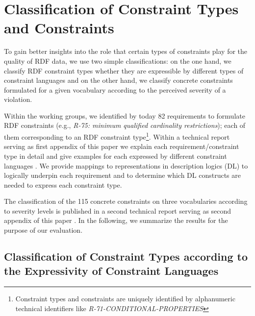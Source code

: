 \documentclass[conference]{IEEEtran}
\begin{document}
\section{Classification of Constraint Types and Constraints}
\label{classification}

To gain better insights into the role that certain types of constraints play for the quality of RDF data, we use two simple classifications: on the one hand, we classify RDF constraint types whether they are expressible by different types of constraint languages and on the other hand, we classify concrete constraints formulated for a given vocabulary according to the perceived severity of a violation. 

Within the working groups, we identified by today 82 requirements to formulate RDF constraints (e.g., \emph{R-75: minimum qualified cardinality restrictions}); each of them corresponding to an RDF constraint type\footnote{Constraint types and constraints are uniquely identified by alphanumeric technical identifiers like \emph{R-71-CONDITIONAL-PROPERTIES}}. 
Within a technical report serving as first appendix of this paper we explain each requirement/constraint type in detail and give examples for each expressed by different constraint languages \cite{BoschNolleAcarEckert2015}. We provide mappings to representations in description logics (DL) \cite{Baader-2003} to logically underpin each requirement and to determine which DL constructs are needed to express each constraint type.




The classification of the 115 concrete constraints on three vocabularies according to severity levels is published in a second technical report serving as second appendix of this paper \cite{BoschZapilkoWackerowEckert2015}.
In the following, we summarize the results for the purpose of our evaluation.

\subsection{Classification of Constraint Types according to the Expressivity of Constraint Languages}
\end{document}
